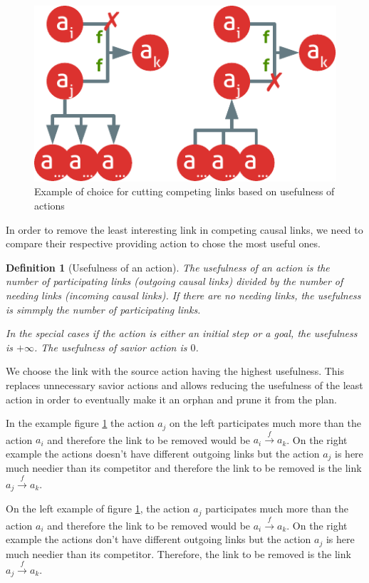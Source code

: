 \documentclass[]{article}
\newtheorem{definition}{Definition}
\begin{document}
\begin{figure}[htbp]
\centering
\includegraphics{graphics/competing.pdf}
\caption{Example of choice for cutting competing links based on
usefulness of actions\label{fig:competing}}
\end{figure}

In order to remove the least interesting link in competing causal links,
we need to compare their respective providing action to chose the most
useful ones.

\begin{definition}[Usefulness of an action]

The usefulness of an action is the number of participating links
(outgoing causal links) divided by the number of needing links (incoming
causal links). If there are no needing links, the usefulness is simmply
the number of participating links.

In the special cases if the action is either an initial step or a goal,
the usefulness is \(+\infty\). The usefulness of savior action is \(0\).

\end{definition}

We choose the link with the source action having the highest usefulness.
This replaces unnecessary savior actions and allows reducing the
usefulness of the least action in order to eventually make it an orphan
and prune it from the plan.

In the example figure \ref{fig:competing} the action \(a_j\) on the left
participates much more than the action \(a_i\) and therefore the link to
be removed would be \(a_i \xrightarrow{f} a_k\). On the right example
the actions doesn't have different outgoing links but the action \(a_j\)
is here much needier than its competitor and therefore the link to be
removed is the link \(a_j \xrightarrow{f} a_k\).

On the left example of figure \ref{fig:competing}, the action \(a_j\)
participates much more than the action \(a_i\) and therefore the link to
be removed would be \(a_i \xrightarrow{f} a_k\). On the right example
the actions don't have different outgoing links but the action \(a_j\)
is here much needier than its competitor. Therefore, the link to be
removed is the link \(a_j \xrightarrow{f} a_k\).
\end{document}
